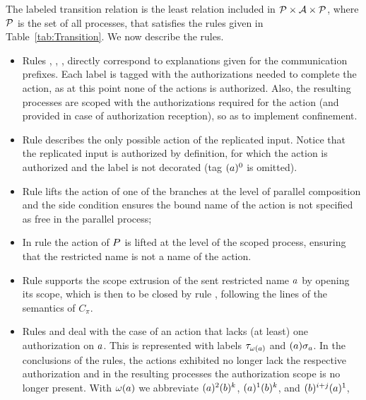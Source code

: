 The labeled transition relation is the least relation included in ${\cal P} \times {\cal A} \times {\cal P}$, where $\cal P$ is the set of all processes, that satisfies the rules given in Table~\ref{tab:Transition}. We now describe the rules.

\begin{itemize}
\item 
Rules , , ,  directly correspond to explanations given for the communication prefixes. %
Each label is tagged with the authorizations needed to complete the action, as at this point none of the actions is authorized. Also, the resulting processes are scoped with the authorizations required for the action (and provided in case of authorization reception),
so as to implement confinement. %
\item 
Rule   describes the only possible action of the
replicated input. Notice that the replicated input is authorized by definition, for which the action is authorized and the label is not decorated (tag $(a)^0$ is omitted). 
\item 
Rule  lifts the action of one of the branches at the level of parallel composition
and the side condition ensures the bound name of the action is not specified as free in the parallel process;
\item 
In rule  the action of $P$ is lifted at the level of the scoped process, ensuring that the restricted name is not a name of the action.
\item 
Rule  supports the scope extrusion of the sent restricted name $a$ by opening its scope,  which is then to be closed by rule , following the lines of the semantics of $C_\pi$. 
\item
Rules  and  deal with the case of an action that lacks (at least) one authorization on $a$. This is represented with labels $\tau_{\omega(a)}$ and $(a)\sigma_a$. 
In the conclusions of the rules, the actions exhibited no longer lack the respective authorization and in the resulting processes the authorization scope is no longer present. With ${\omega(a)}$ we abbreviate $(a)^{2}(b)^k$, $(a)^{1}(b)^k$, and $(b)^{i+j}(a)^1$,

\end{itemize}
